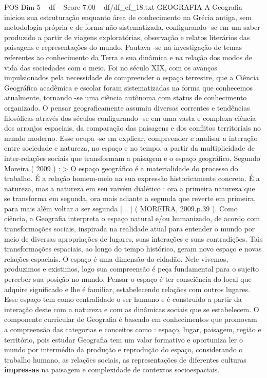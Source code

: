 \begin{textsample}{POS Dim 5 – df – Score 7.00 – df/df\_ef\_18.txt}  \label{ex:f5_pos_153}
GEOGRAFIA A Geografia iniciou sua estruturação enquanto área de conhecimento na Grécia antiga, sem metodologia própria e de forma não sistematizada, configurando -se em um saber produzido a partir de viagens exploratórias, observação e relatos literários das paisagens e representações do mundo.
Pautava -se na investigação de temas referentes ao conhecimento da Terra e sua dinâmica e na relação dos modos de vida das sociedades com o meio.
Foi no século XIX, com os avanços impulsionados pela necessidade de compreender o espaço terrestre, que a Ciência Geográfica acadêmica e escolar foram sistematizadas na forma que conhecemos atualmente, tornando -se uma ciência autônoma com status de conhecimento organizado.
O pensar geograficamente assumiu diversas correntes e tendências filosóficas através dos séculos configurando -se em uma vasta e complexa ciência dos arranjos espaciais, da comparação das paisagens e dos conflitos territoriais no mundo moderno.
Esse ocupa -se em explicar, compreender e analisar a interação entre sociedade e natureza, no espaço e no tempo, a partir da multiplicidade de inter-relações sociais que transformam a paisagem e o espaço geográfico.
Segundo Moreira ( 2009 ) : > O espaço geográfico é a materialidade do processo do trabalho.
É a relação homem-meio na sua expressão historicamente concreta.
É a natureza, mas a natureza em seu vaivém dialético : ora a primeira natureza que se transforma em segunda, ora mais adiante a segunda que reverte em primeira, para mais além voltar a ser segunda [... ] ( MOREIRA, 2009.p.39 ).
Como ciência, a Geografia interpreta o espaço natural e/ou humanizado, de acordo com transformações sociais, inspirada na realidade atual para entender o mundo por meio de diversas apropriações de lugares, suas interações e suas contradições.
Tais transformações espaciais, ao longo do tempo histórico, geram novo espaço e novas relações espaciais.
O espaço é uma dimensão do cidadão.
Nele vivemos, produzimos e existimos, logo sua compreensão é peça fundamental para o sujeito perceber sua posição no mundo.
Pensar o espaço é ter consciência do local que adquire significado e lhe é familiar, estabelecendo relações com outros lugares.
Esse espaço tem como centralidade o ser humano e é construído a partir da interação deste com a natureza e com as dinâmicas sociais que se estabelecem.
O componente curricular de Geografia é baseado em conhecimentos que promovam a compreensão das categorias e conceitos como : espaço, lugar, paisagem, região e território, pois estudar Geografia tem um valor formativo e oportuniza ler o mundo por intermédio da produção e reprodução do espaço, considerando o trabalho humano, as relações sociais, as representações de diferentes culturas \textbf{impressas} na paisagem e complexidade de contextos socioespaciais.

\end{textsample}
